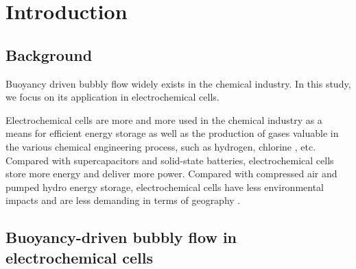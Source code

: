 
\chapter{Introduction}


\section{Background}

Buoyancy driven bubbly flow widely exists in the chemical industry. In this study, we focus on its application in electrochemical cells.


Electrochemical cells are more and more used in the chemical industry as a means for efficient energy storage as well as the production of gases valuable in the various chemical engineering process, such as hydrogen, chlorine \cite{Sokolichin2004}, etc. Compared with supercapacitors and solid-state batteries,
electrochemical cells store more energy and deliver more power. Compared with compressed air and pumped hydro energy storage, electrochemical cells have less environmental impacts and are less demanding in terms of geography \cite{Ke2018}.

\section{Buoyancy-driven bubbly flow in electrochemical cells}


